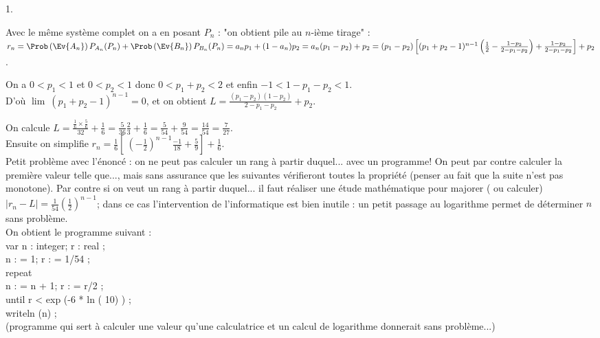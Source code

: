 \documentclass[11pt]{article}%
\begin{document}
\begin{exercice}
\begin{noliste}{1.}
 \item Avec le même système complet on a en posant $P_{n}$ : "on
obtient pile au $n$-ième tirage" : \\
 $r_{n} = \Prob\left(\Ev{A_{n} }\right) P_{A_{n} } (P_{n}) +
\Prob\left(\Ev{B_{n}}\right) P_{B_{n} } (P_{n}) = a_{n} p_{1} + (1 -
a_{n} ) p_{2} = a_{n} ( p_{1} - p_{2}) + p_{2} = (p_{1} - p_{2}) \left[
(p_{1} + p_{2} -1)^{n-1} \left(\frac{1}{2}-\frac{1-p_{2}}{2 -
p_{1}-p_{2}} \right) + \frac{1-p_{2}}{2 - p_{1}-p_{2}} \right] +
p_{2}$. \\

 \item On a $0 < p_{1} < 1$ et $0 < p_{2} < 1$ donc $0 < p_{1} + p_{2}
< 2$ et enfin $-1 < 1 - p_{1} - p_{2} < 1$. \\
 D'où $\lim\ (p_{1} + p_{2} -1)^{n-1} = 0$, et on obtient $L =
\frac{(p_{1} - p_{2}) (1- p_{2})}{2 - p_{1} - p_{2}} + p_{2}$. \\


 \item On calcule $L = \frac{ \frac{1}{6} \times \frac{5}{6} }{ {3}{2}
} + \frac{1}{6} = \frac{5}{36} \frac{2}{3} + \frac{1}{6} = \frac{5}{54}
+ \frac{9}{54} = \frac{14}{54} = \frac{7}{27}$. \\
 Ensuite on simplifie $r_{n} = \frac{1}{6} \left[ \ \left( -
\frac{1}{2} \right)^{n-1} \frac{-1}{18} + \frac{5}{9} \right] +
\frac{1}{6}$. \\
 Petit problème avec l'énoncé : on ne peut pas calculer un rang à
partir duquel... avec un programme! On peut par contre calculer la
première valeur telle que..., mais sans assurance que les suivantes
vérifieront toutes la propriété (penser au fait que la suite n'est pas
monotone). Par contre si on veut un rang à partir duquel... il faut
réaliser une étude mathématique pour majorer ( ou calculer) $| r_{n} -
L | = \frac{1}{54} \left( \frac{1}{2} \right)^{n-1}$; dans ce cas
l'intervention de l'informatique est bien inutile : un petit passage au
logarithme permet de déterminer $n$ sans problème. \\
 On obtient le programme suivant : \\
 var n : integer; r : real ; \\
 n : = 1; r : = 1/54 ;\\
 repeat \\
 n : = n + 1; r : = r/2 ; \\
 until r < exp (-6 * ln ( 10) ) ; \\
 writeln (n) ; \\
 (programme qui sert à calculer une valeur qu'une calculatrice et un
calcul de logarithme donnerait sans problème...) \\
 \end{noliste}


\end{exercice}
\end{document}
